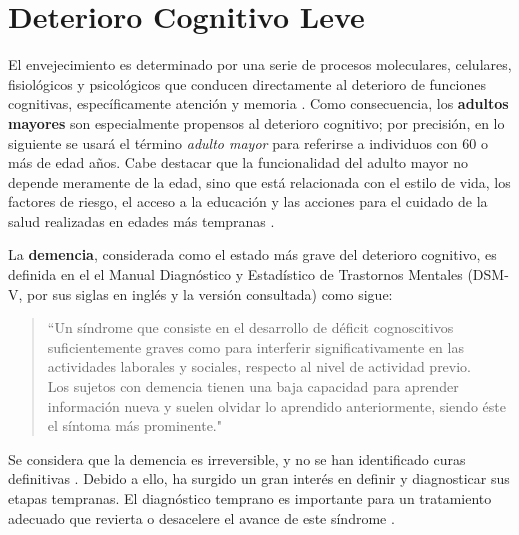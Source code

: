 
\section{Deterioro Cognitivo Leve}
\label{seccion:dcl}

%

El envejecimiento es determinado por una serie de procesos moleculares, celulares, fisiológicos y psicológicos que conducen directamente al deterioro de funciones cognitivas, específicamente atención y memoria \cite{Park09}.
%
Como consecuencia, los \textbf{adultos mayores} son especialmente propensos al deterioro cognitivo; por precisión, en lo siguiente se usará el término \textit{adulto mayor} para referirse a individuos con 60 o más de edad años.
%
Cabe destacar que la funcionalidad del adulto mayor no depende meramente de la edad, sino que está relacionada con el estilo de vida, los factores de riesgo, el acceso a la educación y las acciones para el cuidado de la salud realizadas en edades más tempranas \cite{Sanhueza14}.
 
La \textbf{demencia}, considerada como el estado más grave del deterioro cognitivo, es definida en el el Manual Diagnóstico y Estadístico de Trastornos Mentales (DSM-V, por sus siglas en inglés y la versión consultada) como sigue:
\begin{quote}
``Un síndrome que consiste en el desarrollo de déficit cognoscitivos suficientemente graves como para 
interferir significativamente en las actividades laborales y sociales, respecto al nivel de 
actividad previo.\\
%
Los sujetos con demencia tienen una baja capacidad para aprender información nueva y suelen olvidar 
lo aprendido anteriormente, siendo éste el síntoma más prominente."  \cite{DCM5}
\end{quote}

Se considera que la demencia es irreversible, y no se han identificado curas definitivas \cite{PlanAlzheimer04}. 
%
Debido a ello, ha surgido un gran interés en definir y diagnosticar sus etapas tempranas. 
%
El diagnóstico temprano es importante para un tratamiento adecuado que revierta o desacelere el avance de este síndrome \cite{Knopman01}.

